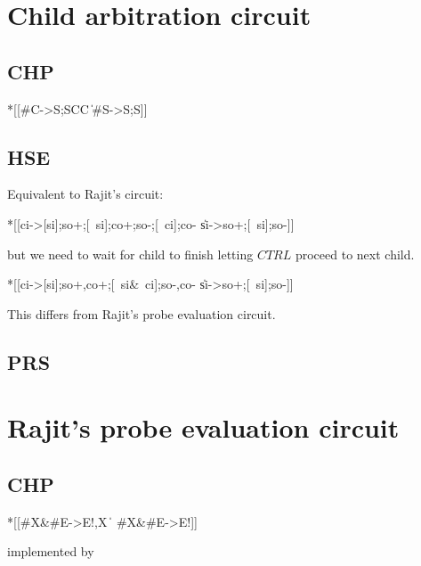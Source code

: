 \documentclass{article}
\begin{document}
\section{Child arbitration circuit}

\subsection{CHP}

\begin{csp}
*[[#C->S;S\star\!C\star\!C
  \|#S->S;S]]
\end{csp}

\subsection{HSE}

Equivalent to Rajit's circuit:

\begin{hse}
*[[ci->[si];so+;[~si];co+;so-;[~ci];co-
  \|si->so+;[~si];so-]]
\end{hse}

but we need to wait for child to finish letting $CTRL$ proceed to next child.

\begin{hse}
*[[ci->[si];so+,co+;[~si&~ci];so-,co-
  \|si->so+;[~si];so-]]
\end{hse}

This differs from Rajit's probe evaluation circuit.
\subsection{PRS}

\begin{prs2}
\end{prs2}
\section{Rajit's probe evaluation circuit}

\subsection{CHP}

\begin{csp}
*[[#X&#E->E!,X
  \|~#X&#E->E!]]
\end{csp}

implemented by
\end{document}

